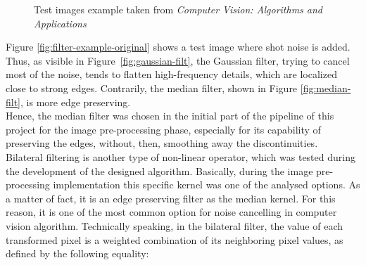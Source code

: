 \begin{figure}[t]
	\centering
\caption{Test images example taken from \textit{Computer Vision: Algorithms and Applications} \cite{Szeliski2011}}
\label{fig:filter-image-example}
\end{figure}

Figure \ref{fig:filter-example-original} shows a test image where shot noise is added.
Thus, as visible in Figure~\ref{fig:gaussian-filt}, the Gaussian filter, trying to cancel most of the noise, tends to flatten high-frequency details, which are localized close to strong edges.
Contrarily, the median filter, shown in Figure \ref{fig:median-filt}, is more edge preserving.\\
Hence, the median filter was chosen in the initial part of the pipeline of this project for the image pre-processing phase, especially for its capability of preserving the edges, without, then, smoothing away the discontinuities.\\
Bilateral filtering is another type of non-linear operator, which was tested during the development of the designed algorithm.
Basically, during the image pre-processing implementation this specific kernel was one of the analysed options.
As a matter of fact, it is an edge preserving filter as the median kernel.
For this reason, it is one of the most common option for noise cancelling in computer vision algorithm.
Technically speaking, in the bilateral filter, the value of each transformed pixel is a weighted combination of its neighboring pixel values, as defined by the following equality:

